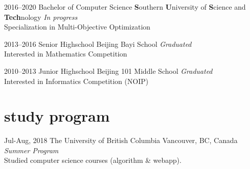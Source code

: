 \documentclass[]{friggeri-cv-a4}
\begin{document}
\begin{entrylist}




\entry
{2016--2020}
{Bachelor {\normalfont of Computer Science}}
{\textbf{S}outhern \textbf{U}niversity of \textbf{S}cience and \textbf{Tech}nology}
{\emph{In progress}\\
Specialization in Multi-Objective Optimization}


\entry
{2013--2016}
{Senior {\normalfont Highschool}}
{Beijing Bayi School}
{\emph{Graduated}\\
Interested in Mathematics Competition}


\entry
{2010--2013}
{Junior {\normalfont Highschool}}
{Beijing 101 Middle School}
{\emph{Graduated}\\
Interested in Informatics Competition (NOIP)}


\end{entrylist}


\section{study program}

\begin{entrylist}

\entry
{Jul-Aug, 2018}
{The University of British Columbia}
{Vancouver, BC, Canada}
{\emph{Summer Program} \\
Studied computer science courses (algorithm \& webapp).}




\end{entrylist}
\end{document}
